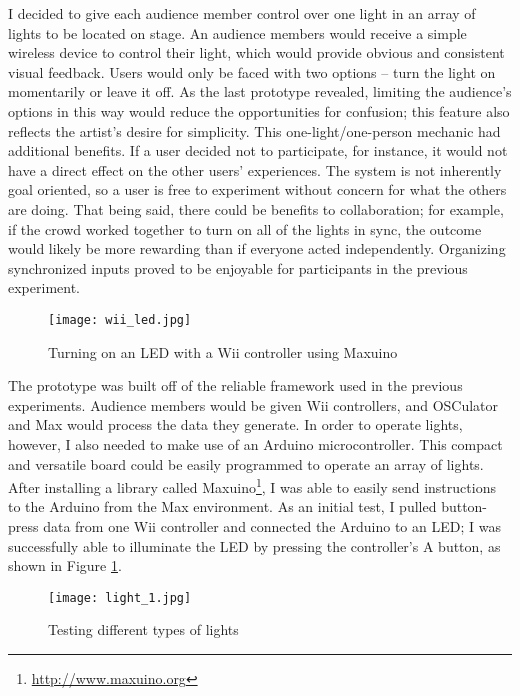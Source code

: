 I decided to give each audience member control over one light in an array of lights to be located on stage. An audience members would receive a simple wireless device to control their light, which would provide obvious and consistent visual feedback. Users would only be faced with two options -- turn the light on momentarily or leave it off. As the last prototype revealed, limiting the audience's options in this way would reduce the opportunities for confusion; this feature also reflects the artist's desire for simplicity. This one-light/one-person mechanic had additional benefits. If a user decided not to participate, for instance, it would not have a direct effect on the other users' experiences. The system is not inherently goal oriented, so a user is free to experiment without concern for what the others are doing. That being said, there could be benefits to collaboration; for example, if the crowd worked together to turn on all of the lights in sync, the outcome would likely be more rewarding than if everyone acted independently. Organizing synchronized inputs proved to be enjoyable for participants in the previous experiment.

\begin{figure}
	\centering

	\texttt{[image: wii\_led.jpg]}
	\caption{Turning on an LED with a Wii controller using Maxuino}

	\label{prototyping3.1}
\end{figure}

The prototype was built off of the reliable framework used in the previous experiments. Audience members would be given Wii controllers, and OSCulator and Max would process the data they generate. In order to operate lights, however, I also needed to make use of an Arduino microcontroller. This compact and versatile board could be easily programmed to operate an array of lights. After installing a library called Maxuino\footnote{\url{http://www.maxuino.org}}, I was able to easily send instructions to the Arduino from the Max environment. As an initial test, I pulled button-press data from one Wii controller and connected the Arduino to an LED; I was successfully able to illuminate the LED by pressing the controller's A button, as shown in Figure \ref{prototyping3.1}.

\begin{figure}
	\centering

	\texttt{[image: light\_1.jpg]}
	\caption{Testing different types of lights}

	\label{prototyping3.2}
\end{figure}

